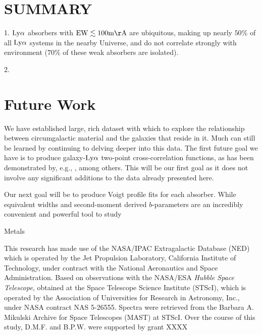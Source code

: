\documentclass[twocolumn,tighten]{aastex62}
\begin{document}
\section{SUMMARY}
1. $\rm Ly\alpha$ absorbers with $\rm EW \lesssim 100 m\AA$ are ubiquitous, making up nearly $50\%$ of all $\rm Ly\alpha$ systems in the nearby Universe, and do not correlate strongly with environment ($70\%$ of these weak absorbers are isolated). 

2. 


\section{Future Work}

We have established large, rich dataset with which to explore the relationship between circumgalactic material and the galaxies that reside in it. Much can still be learned by continuing to delving deeper into this data. The first future goal we have is to produce galaxy-$\rm Ly\alpha$ two-point cross-correlation functions, as has been demonstrated by, e.g., \cite{chen2005}, among others. This will be our first goal as it does not involve any significant additions to the data already presented here.

Our next goal will be to produce Voigt profile fits for each absorber. While equivalent widths and second-moment derived $b$-parameters are an incredibly convenient and powerful tool to study

Metals





\acknowledgements

This research has made use of the NASA/IPAC Extragalactic Database (NED) which is operated by the Jet Propulsion Laboratory, California Institute of Technology, under contract with the National Aeronautics and Space Administration. Based on observations with the NASA/ESA \textit{Hubble Space Telescope}, obtained at the Space Telescope Science Institute (STScI), which is operated by the Association of Universities for Research in Astronomy, Inc., under NASA contract NAS 5-26555. Spectra were retrieved from the Barbara A. Mikulski Archive for Space Telescopes (MAST) at STScI. Over the course of this study, D.M.F. and B.P.W. were supported by grant XXXX
\end{document}
